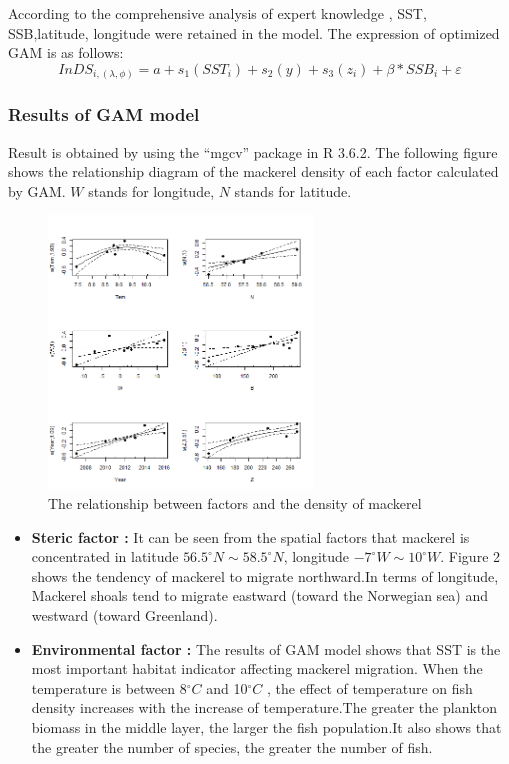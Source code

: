 \documentclass{mcmthesis}
\begin{document}
According to the comprehensive analysis of expert knowledge\cite{2} , SST, SSB,latitude, longitude were retained in the model.
The  expression of optimized GAM is as follows:
\begin{equation}
In DS_{i,(\lambda,\phi)} = a + s_1(SST_i)+s_2(y)+s_3(z_i)+\beta*SSB_i + \varepsilon
\end{equation}



\subsubsection{Results of GAM model}
 Result is obtained by using the “mgcv” package in R 3.6.2. The following figure shows the relationship diagram of the mackerel density of each factor calculated by GAM. $W$ stands for longitude, $N$ stands for latitude.
  \begin{figure}[htbp]
\small\centering
\includegraphics[width=7cm]{./figures/presult.png}
\caption{The relationship between factors and the density of mackerel}
\end{figure}
\begin{itemize}
\item \textbf{Steric factor : }
It can be seen from the spatial factors that mackerel is concentrated in latitude $56.5^\circ N\sim 58.5^\circ N$, longitude $-7^\circ W\sim 10^\circ W$. Figure 2 shows the tendency of mackerel to migrate northward.In terms of longitude, Mackerel shoals tend to migrate eastward (toward the Norwegian sea) and westward (toward Greenland).
\item \textbf{Environmental factor : }The results of GAM model shows that SST is the most important habitat indicator affecting mackerel migration. When the temperature is between 8$^\circ C$ and 10$^\circ C$ , the effect of temperature on fish density increases with the increase of temperature.The greater the plankton biomass in the middle layer, the larger the fish population.It also shows that the greater the number of species, the greater the number of fish.
\end{itemize}
\end{document}
